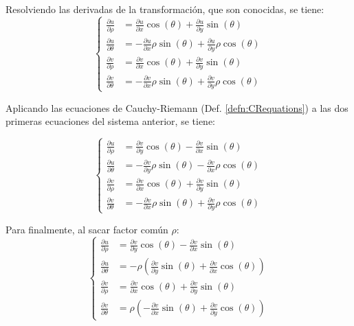 Resolviendo las derivadas de la transformación, que son conocidas, se tiene:
\begin{equation*}
    \left\{
    \begin{aligned}
        \frac{\partial u}{\partial \rho} &= \frac{\partial u}{\partial x} \cos(\theta) + \frac{\partial u}{\partial y} \sin(\theta)
        \\[1ex]
        \frac{\partial u}{\partial \theta} &= -  \frac{\partial u}{\partial x} \rho \sin(\theta) + \frac{\partial u}{\partial y} \rho \cos(\theta)
        \\[1ex]
        \frac{\partial v}{\partial \rho} &= \frac{\partial v}{\partial x} \cos(\theta) + \frac{\partial v}{\partial y} \sin(\theta)
        \\[1ex]
        \frac{\partial v}{\partial \theta} &= - \frac{\partial v}{\partial x} \rho \sin(\theta) + \frac{\partial v}{\partial y} \rho \cos(\theta)
    \end{aligned}
    \right.
\end{equation*}

Aplicando las ecuaciones de Cauchy-Riemann (Def. \ref{defn:CRequations}) a las dos primeras ecuaciones del sistema anterior, se tiene:

\begin{equation*}
    \left\{
    \begin{aligned}
        \frac{\partial u}{\partial \rho} &= \frac{\partial v}{\partial y} \cos(\theta) - \frac{\partial v}{\partial x} \sin(\theta)
        \\[1ex]
        \frac{\partial u}{\partial \theta} &= -  \frac{\partial v}{\partial y} \rho \sin(\theta) - \frac{\partial v}{\partial x} \rho \cos(\theta)
        \\[1ex]
        \frac{\partial v}{\partial \rho} &= \frac{\partial v}{\partial x} \cos(\theta) + \frac{\partial v}{\partial y} \sin(\theta)
        \\[1ex]
        \frac{\partial v}{\partial \theta} &= -  \frac{\partial v}{\partial x} \rho \sin(\theta) + \frac{\partial v}{\partial y} \rho \cos(\theta)
    \end{aligned}
    \right.
\end{equation*}

Para finalmente, al sacar factor común $\rho$:
\begin{equation*}
    \left\{
    \begin{aligned}
        \frac{\partial u}{\partial \rho} &= \frac{\partial v}{\partial y} \cos(\theta) - \frac{\partial v}{\partial x} \sin(\theta)
        \\[1ex]
        \frac{\partial u}{\partial \theta} &= -\rho \left(  \frac{\partial v}{\partial y} \sin(\theta) + \frac{\partial v}{\partial x} \cos(\theta) \right)
        \\[1ex]
        \frac{\partial v}{\partial \rho} &= \frac{\partial v}{\partial x} \cos(\theta) + \frac{\partial v}{\partial y} \sin(\theta)
        \\[1ex]
        \frac{\partial v}{\partial \theta} &= \rho \left( -  \frac{\partial v}{\partial x} \sin(\theta) + \frac{\partial v}{\partial y} \cos(\theta) \right)
    \end{aligned}
    \right.
\end{equation*}

